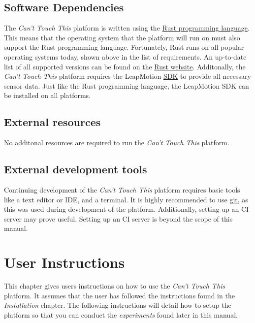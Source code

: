 \documentclass[a4paper]{article}
\begin{document}
  \subsection{Software Dependencies}
  The \textit{Can't Touch This} platform is written using the
  \href{https://rust-lang.org}{Rust programming language}. This means that the
  operating system that the platform will run on must also support the Rust
  programming language. Fortunately, Rust runs on all popular operating systems
  today, shown above in the list of requirements. An up-to-date list of all
  supported versions can be found on the
  \href{https://forge.rust-lang.org/platform-support.html}{Rust website}.
  Additonally, the \textit{Can't Touch This} platform requires the LeapMotion
  \href{https://developer.leapmotion.com/sdk/v2}{SDK} to provide all necessary
  sensor data. Just like the Rust programming language, the LeapMotion SDK can
  be installed on all platforms.

  \subsection{External resources}
  No additonal resources are required to run the \textit{Can't Touch This}
  platform.

  \subsection{External development tools}
  Continuing development of the \textit{Can't Touch This} platform requires
  basic tools like a text editor or IDE, and a terminal. It is highly
  recommended to use \href{https://git-scm.com/}{git}, as this was used during
  development of the platform. Additionally, setting up an CI server may prove
  useful. Setting up an CI server is beyond the scope of this manual.
  \clearpage

  \section{User Instructions}
  This chapter gives users instructions on how to use the \textit{Can't Touch
    This} platform. It assumes that the user has followed the instructions found
  in the \textit{Installation} chapter. The following instructions will detail
  how to setup the platform so that you can conduct the \textit{experiments}
  found later in this manual.
\end{document}
